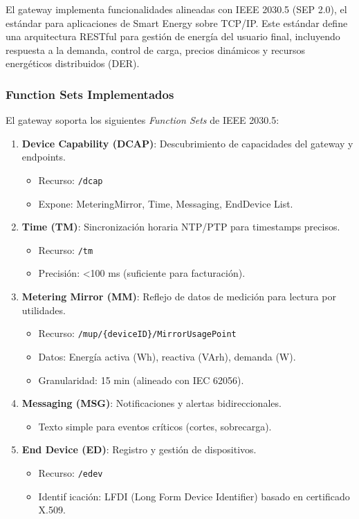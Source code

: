 El gateway implementa funcionalidades alineadas con IEEE 2030.5 (SEP 2.0), el estándar para aplicaciones de Smart Energy sobre TCP/IP. Este estándar define una arquitectura RESTful para gestión de energía del usuario final, incluyendo respuesta a la demanda, control de carga, precios dinámicos y recursos energéticos distribuidos (DER).

\subsubsection{Function Sets Implementados}

El gateway soporta los siguientes \textit{Function Sets} de IEEE 2030.5:

\begin{enumerate}
    \item \textbf{Device Capability (DCAP)}: Descubrimiento de capacidades del gateway y endpoints.
    \begin{itemize}
        \item Recurso: \texttt{/dcap}
        \item Expone: MeteringMirror, Time, Messaging, EndDevice List.
    \end{itemize}
    
    \item \textbf{Time (TM)}: Sincronización horaria NTP/PTP para timestamps precisos.
    \begin{itemize}
        \item Recurso: \texttt{/tm}
        \item Precisión: <100 ms (suficiente para facturación).
    \end{itemize}
    
    \item \textbf{Metering Mirror (MM)}: Reflejo de datos de medición para lectura por utilidades.
    \begin{itemize}
        \item Recurso: \texttt{/mup/\{deviceID\}/MirrorUsagePoint}
        \item Datos: Energía activa (Wh), reactiva (VArh), demanda (W).
        \item Granularidad: 15 min (alineado con IEC 62056).
    \end{itemize}
    
    \item \textbf{Messaging (MSG)}: Notificaciones y alertas bidireccionales.
    \begin{itemize}
        \item Texto simple para eventos críticos (cortes, sobrecarga).
    \end{itemize}
    
    \item \textbf{End Device (ED)}: Registro y gestión de dispositivos.
    \begin{itemize}
        \item Recurso: \texttt{/edev}
        \item Identif icación: LFDI (Long Form Device Identifier) basado en certificado X.509.
    \end{itemize}
\end{enumerate}

